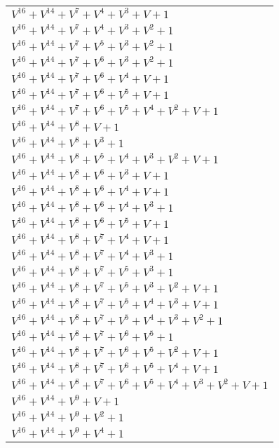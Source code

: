 \documentclass[12pt]{article}
\begin{document}
\begin{adjustwidth}{-4cm}{}
\begin{center}
\begin{longtable}{|l|}
$V^{16}  +V^{14}  +V^{7}  +V^{4}  +V^{3}  + V + 1$ \\
$V^{16}  +V^{14}  +V^{7}  +V^{4}  +V^{3}  +V^{2}  + 1$ \\
$V^{16}  +V^{14}  +V^{7}  +V^{5}  +V^{3}  +V^{2}  + 1$ \\
$V^{16}  +V^{14}  +V^{7}  +V^{6}  +V^{3}  +V^{2}  + 1$ \\
$V^{16}  +V^{14}  +V^{7}  +V^{6}  +V^{4}  + V + 1$ \\
$V^{16}  +V^{14}  +V^{7}  +V^{6}  +V^{5}  + V + 1$ \\
$V^{16}  +V^{14}  +V^{7}  +V^{6}  +V^{5}  +V^{4}  +V^{2}  + V + 1$ \\
$V^{16}  +V^{14}  +V^{8}  + V + 1$ \\
$V^{16}  +V^{14}  +V^{8}  +V^{3}  + 1$ \\
$V^{16}  +V^{14}  +V^{8}  +V^{5}  +V^{4}  +V^{3}  +V^{2}  + V + 1$ \\
$V^{16}  +V^{14}  +V^{8}  +V^{6}  +V^{3}  + V + 1$ \\
$V^{16}  +V^{14}  +V^{8}  +V^{6}  +V^{4}  + V + 1$ \\
$V^{16}  +V^{14}  +V^{8}  +V^{6}  +V^{4}  +V^{3}  + 1$ \\
$V^{16}  +V^{14}  +V^{8}  +V^{6}  +V^{5}  + V + 1$ \\
$V^{16}  +V^{14}  +V^{8}  +V^{7}  +V^{4}  + V + 1$ \\
$V^{16}  +V^{14}  +V^{8}  +V^{7}  +V^{4}  +V^{3}  + 1$ \\
$V^{16}  +V^{14}  +V^{8}  +V^{7}  +V^{5}  +V^{3}  + 1$ \\
$V^{16}  +V^{14}  +V^{8}  +V^{7}  +V^{5}  +V^{3}  +V^{2}  + V + 1$ \\
$V^{16}  +V^{14}  +V^{8}  +V^{7}  +V^{5}  +V^{4}  +V^{3}  + V + 1$ \\
$V^{16}  +V^{14}  +V^{8}  +V^{7}  +V^{5}  +V^{4}  +V^{3}  +V^{2}  + 1$ \\
$V^{16}  +V^{14}  +V^{8}  +V^{7}  +V^{6}  +V^{5}  + 1$ \\
$V^{16}  +V^{14}  +V^{8}  +V^{7}  +V^{6}  +V^{5}  +V^{2}  + V + 1$ \\
$V^{16}  +V^{14}  +V^{8}  +V^{7}  +V^{6}  +V^{5}  +V^{4}  + V + 1$ \\
$V^{16}  +V^{14}  +V^{8}  +V^{7}  +V^{6}  +V^{5}  +V^{4}  +V^{3}  +V^{2}  + V + 1$ \\
$V^{16}  +V^{14}  +V^{9}  + V + 1$ \\
$V^{16}  +V^{14}  +V^{9}  +V^{2}  + 1$ \\
$V^{16}  +V^{14}  +V^{9}  +V^{4}  + 1$ \\

\end{longtable}
\end{center}
\end{adjustwidth}
\end{document}
